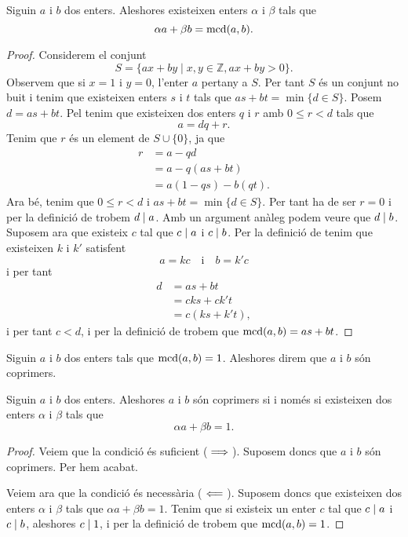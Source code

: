 \documentclass[../Apunts.tex]{subfiles}
\begin{document}
	\begin{theorem}
		\label{thm:identitat de Bézout}
		Siguin \(a\) i \(b\) dos enters. Aleshores existeixen enters \(\alpha\) i \(\beta\) tals que
		\[\alpha a+\beta b=\operatorname{mcd}(a,b).\]
		\begin{proof}
			Considerem el conjunt
			\[S=\{ax+by\mid x,y\in\mathbb{Z}, ax+by>0\}.\]
			Observem que si \(x=1\) i \(y=0\), l'enter \(a\) pertany a \(S\). Per tant \(S\) és un conjunt no buit i tenim que existeixen enters \(s\) i \(t\) tals que \(as+bt=\min\{d\in S\}\). Posem \(d=as+bt\). Pel  tenim que existeixen dos enters \(q\) i \(r\) amb \(0\leq r<d\) tals que
			\[a=dq+r.\]
			Tenim que \(r\) és un element de \(S\cup\{0\}\), ja que
			\begin{align*}
			r&=a-qd\\
			&=a-q(as+bt)\\
			&=a(1-qs)-b(qt).
			\end{align*}
			Ara bé, tenim que \(0\leq r<d\) i \(as+bt=\min\{d\in S\}\). Per tant ha de ser \(r=0\) i per la definició de  trobem \(d\mathrel{|} a\). Amb un argument anàleg podem veure que \(d\mathrel{|} b\). Suposem ara que existeix \(c\) tal que \(c\mathrel{|} a\) i \(c\mathrel{|} b\). Per la definició de  tenim que existeixen \(k\) i \(k'\) satisfent
			\[a=kc\quad\text{i}\quad b=k'c\]
			i per tant
			\begin{align*}
			d&=as+bt\\
			&=cks+ck't\\
			&=c(ks+k't),
			\end{align*}
			i per tant \(c<d\), i per la definició de  trobem que \(\operatorname{mcd}(a,b)=as+bt\).
		\end{proof}
	\end{theorem}
	\begin{definition}[Coprimers]
		\label{def:coprimers}
		Siguin \(a\) i \(b\) dos enters tals que \(\operatorname{mcd}(a,b)=1\). Aleshores direm que \(a\) i \(b\) són coprimers.
	\end{definition}
	\begin{theorem}
		\label{thm:condició equivalent a coprimers per Bézout}
		Siguin \(a\) i \(b\) dos enters. Aleshores \(a\) i \(b\) són coprimers si i només si existeixen dos enters \(\alpha\) i \(\beta\) tals que
		\[\alpha a+\beta b=1.\]
		\begin{proof}
			Veiem que la condició és suficient (\(\implies\)). Suposem doncs que \(a\) i \(b\) són coprimers. Per  hem acabat.
			
			Veiem ara que la condició és necessària (\(\impliedby\)). Suposem doncs que existeixen dos enters \(\alpha\) i \(\beta\) tals que \(\alpha a+\beta b=1\). Tenim que si existeix un enter \(c\) tal que \(c\mathrel{|} a\) i \(c\mathrel{|} b\), aleshores \(c\mathrel{|} 1\), i per la definició de  trobem que \(\operatorname{mcd}(a,b)=1\).
		\end{proof}
	\end{theorem}
\end{document}
